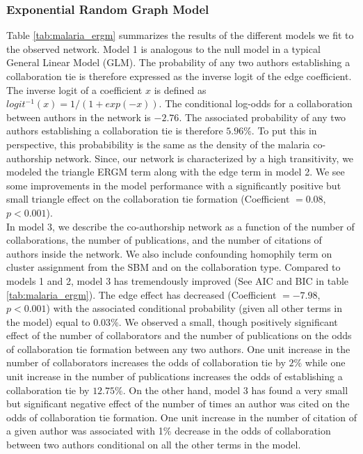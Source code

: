 \subsubsection{Exponential Random Graph Model}
\label{sec:malaria_results_ergm}
Table \ref{tab:malaria_ergm} summarizes the results of the different models we fit to the observed network. Model 1 is analogous to the null model in a typical General Linear Model (GLM). The probability of any two authors establishing a collaboration tie is therefore expressed as the inverse logit of the edge coefficient. The inverse logit of a coefficient $x$ is defined as $logit^{-1}(x)=1/(1+exp(-x))$. The conditional log-odds for a collaboration between authors in the network is $-2.76$. The associated probability of any two authors establishing a collaboration tie is therefore $5.96\%$. To put this in perspective, this probabibility is the same as the density of the malaria co-authorship network. Since, our network is characterized by a high transitivity, we modeled the triangle ERGM term along with the edge term in model 2. We see some improvements in the model performance with a significantly positive but small triangle effect on the collaboration tie formation (Coefficient $= 0.08$, $p<0.001$). \\
In model 3, we describe the co-authorship network as a function of the number of collaborations, the number of publications, and the number of citations of authors inside the network. We also include confounding homophily term on cluster assignment from the SBM and on the collaboration type. Compared to models 1 and 2, model 3 has tremendously improved (See AIC and BIC in table \ref{tab:malaria_ergm}). The edge effect has decreased (Coefficient $=-7.98$, $p<0.001$) with the associated conditional probability (given all other terms in the model) equal to $0.03\%$. We observed a small, though positively significant effect of the number of collaborators and the number of publications on the odds of collaboration tie formation between any two authors. One unit increase in the number of collaborators increases the odds of collaboration tie by $2\%$ while one unit increase in the number of publications increases the odds of establishing a collaboration tie by $12.75\%$. On the other hand, model 3 has found a very small but significant negative effect of the number of times an author was cited on the odds of collaboration tie formation. One unit increase in the number of citation of a given author was associated with 1\% decrease in the odds of collaboration between two authors conditional on all the other terms in the model. \\
